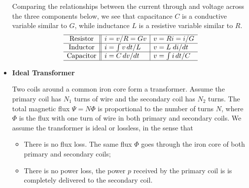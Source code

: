 \documentclass{article}
\begin{document}
\begin{itemize}
  Comparing the relationships between the current through and voltage
  across the three components below, we see that capacitance $C$ is a 
  conductive variable similar to $G$, while inductance $L$ is a resistive 
  variable similar to $R$.
  \begin{equation}
    \begin{array}{c||l|l}\hline
      \mbox{Resistor}  & i=v/R=Gv & v=Ri=i/G \\ \hline
      \mbox{Inductor}  & i=\int v\,dt/L & v=L\;di/dt \\ \hline
      \mbox{Capacitor} & i=C\,dv/dt & v=\int i\,dt/C \\ \hline
    \end{array}
  \end{equation}


\item {\bf Ideal Transformer}


  Two coils around a common iron core form a transformer. Assume the
  primary coil has $N_1$ turns of wire and the secondary coil has $N_2$ 
  turns. The total magnetic flux $\Psi=N\Phi$ is proportional to the 
  number of turns $N$, where $\Phi$ is the flux with one turn of wire
  in both primary and secondary coils. We assume the transformer is 
  ideal or lossless, in the sense that 
  \begin{itemize}
  \item There is no flux loss. The same flux $\Phi$ goes through the 
    iron core of both primary and secondary coils; 
  \item There is no power loss, the power $p$ received by the primary 
    coil is is completely delivered to the secondary coil.
  \end{itemize}


\end{itemize}
\end{document}
